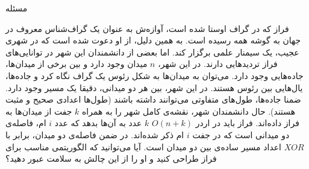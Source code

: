 ‌مسئله

فراز که در گراف اوستا شده است، آوازه‌ش به عنوان یک گراف‌شناس معروف در جهان به گوشه همه رسیده است. به همین دلیل، از او دعوت شده است که در شهری عجیب، یک سیمنار علمی برگزار کند. اما بعضی از دانشمندان این شهر در توانایی‌های فراز تردید‌هایی دارند. در این شهر، 
$n$
میدان وجود دارد و بین برخی از میدان‌ها، جاده‌هایی وجود دارد. می‌توان به میدان‌ها به شکل رئوس یک گراف نگاه کرد و جاد‌ه‌ها، یال‌هایی بین رئوس هستند. در این شهر، بین هر دو میدانی، دقیقا یک مسیر وجود دارد. ضمنا جاده‌ها، طول‌های متفاوتی می‌توانند داشته باشند (طول‌ها اعدادی صحیح و مثبت هستند). حال دانشمندان شهر، نقشه‌ی کامل شهر را به همراه 
$k$
جفت از میدان‌ها به فراز داده‌اند. فراز باید در اردر 
$O(n+k)$
$k$ عدد به آن‌ها بدهد که عدد 
$i$
ام، فاصله‌‌ی دو میدانی است که در جفت 
$i$
ام ذکر شده‌اند. در ضمن فاصله‌ی دو میدان، برابر با 
$XOR$
اعداد مسیر‌ ساده‌ی بین دو میدان است. آیا می‌توانید که الگوریتمی مناسب برای فراز طراحی کنید و او را از این چالش به سلامت عبور دهید؟









